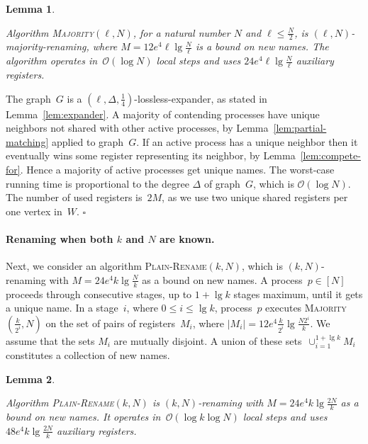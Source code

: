 \documentclass[11pt]{article}
\newcommand{\BBB}{\vspace*{-\bigskipamount}}
\newcommand{\cO}{\mathcal{O}}
\newcommand{\Paragraph}[1]{\BBB\paragraph{#1}}
\newcommand{\qed}{\hfill $\square$ \smallbreak}
\newenvironment{proof}{\noindent{\bf Proof:}}{\qed}
\newtheorem{lemma}{Lemma}
\begin{document}
\begin{lemma}
\label{lem:majority}

Algorithm \textsc{Majority}$(\ell,N)$,  for a natural number $N$ and $\ell\le \frac{N}{2}$, is $(\ell,N)$-majority-renaming, where $M=12e^4\ell\lg\frac{N}{\ell}$ is a  bound on new names.
The algorithm operates in~$\cO(\log N)$ local steps and uses $24e^4\ell\lg\frac{N}{\ell}$ auxiliary registers.
\end{lemma}


\begin{proof} 
The graph~$G$ is a $(\ell,\Delta,\frac{1}{4})$-lossless-expander, as stated in Lemma~\ref{lem:expander}.
A majority of contending processes have unique neighbors not shared with other active processes, by Lemma~\ref{lem:partial-matching} applied to graph~$G$.
If an active process has a unique neighbor then it eventually wins some register representing its neighbor, by Lemma~\ref{lem:compete-for}. 
Hence a majority of active processes get unique names.
The worst-case running time is proportional to the degree $\Delta$ of graph~$G$, which is $\cO(\log N)$. 
The number of used registers is~$2M$, as we use two unique shared registers per one vertex in~$W$. 
\end{proof} 




\Paragraph{Renaming when both $k$ and $N$ are known.}


Next, we consider an algorithm \textsc{Plain-Rename}$(k,N)$, which is  $(k,N)$-renaming with $M=24e^4k\lg\frac{N}{k}$ as a bound on new names.
A process~$p\in [N]$ proceeds through consecutive stages,  up to $1+\lg k $ stages maximum,  until it gets a unique name. 
In a stage~$i$, where $0\le i\le \lg k$, process~$p$ executes \textsc{Majority}$(\frac{k}{2^i},N)$ on the set of pairs of registers~$M_i$, where $|M_i|=12e^4 \frac{k}{2^i}\lg\frac{N2^i}{k}$.
We assume that the sets $M_i$ are mutually disjoint.
A union of these sets~$\cup_{i=1}^{1+\lg k }M_i$ constitutes a collection of new names.



\begin{lemma}
\label{lem:Plain-Rename}

Algorithm \textsc{Plain-Rename}$(k,N)$ is $(k,N)$-renaming with $M=24e^4k\lg\frac{2N}{k}$ as a bound on new names.
It  operates in~$\cO(\log k\log N)$ local steps and uses $48e^4k\lg\frac{2N}{k}$ auxiliary registers. 
\end{lemma}
\end{document}
